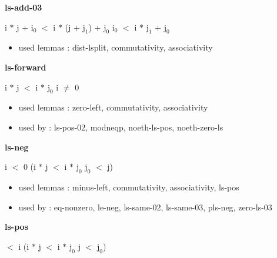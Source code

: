 \documentclass[a4paper]{article}
\begin{document}
\medskip

\bigskip

{\large\bf ls-add-03}

\medskip

 \Fol i $*$ j + $\mbox{i}_{0}$ $<$ i $*$ (j + $\mbox{j}_{1}$) + $\mbox{j}_{0}$ \Equiv $\mbox{i}_{0}$ $<$ i $*$ $\mbox{j}_{1}$ + $\mbox{j}_{0}$

\begin{itemize}


\item       used lemmas  : dist-lsplit, commutativity, associativity

\end{itemize}

\medskip

\bigskip

{\large\bf ls-forward}

\medskip

 \Fol i $*$ j $<$ i $*$ $\mbox{j}_{0}$ \Imp i $\neq$ 0

\begin{itemize}


\item       used lemmas  : zero-left, commutativity, associativity
\item       used by      : ls-pos-02, modneqp, noeth-ls-pos, noeth-zero-ls

\end{itemize}

\medskip

\bigskip

{\large\bf ls-neg}

\medskip

 \Fol i $<$ 0 \Imp (i $*$ j $<$ i $*$ $\mbox{j}_{0}$ \Equiv $\mbox{j}_{0}$ $<$ j)

\begin{itemize}


\item       used lemmas  : minus-left, commutativity, associativity, ls-pos
\item       used by      : eq-nonzero, le-neg, ls-same-02, ls-same-03, pls-neg, zero-ls-03

\end{itemize}

\medskip

\bigskip

{\large\bf ls-pos}

\medskip

  $<$ i \Imp (i $*$ j $<$ i $*$ $\mbox{j}_{0}$ \Equiv j $<$ $\mbox{j}_{0}$)
\end{document}
